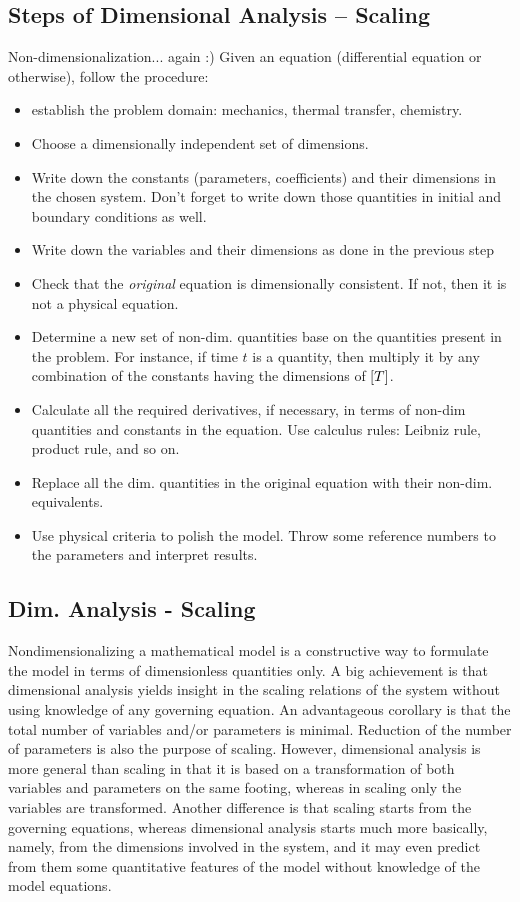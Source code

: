 \subsection{Steps of Dimensional Analysis -- Scaling}
Non-dimensionalization... again :) Given an equation (differential equation or otherwise), follow the procedure:
\begin{itemize}
\item establish the problem domain: mechanics, thermal transfer, chemistry.
%
\item Choose a dimensionally independent set of dimensions.
%
\item Write down the constants (parameters, coefficients) and their dimensions in the chosen system. Don't forget to write down those quantities in initial and boundary conditions as well.
%
\item Write down the variables and their dimensions as done in the previous step
%
\item Check that the \emph{original} equation is dimensionally consistent. If not, then it is not a physical equation.
%
\item Determine a new set of non-dim. quantities base on the quantities present in the problem. For instance, if time $t$ is a quantity, then multiply it by any combination of the constants having the dimensions of $\left[{T}\right]$.
%
\item Calculate all the required derivatives, if necessary, in terms of non-dim quantities and constants in the equation. Use calculus rules: Leibniz rule, product rule, and so on.
%
\item Replace all the dim. quantities in the original equation with their non-dim. equivalents.
%
\item Use physical criteria to polish the model. Throw some reference numbers to the parameters and interpret results.
%
\end{itemize}


\subsection{Dim. Analysis - Scaling}
Nondimensionalizing a mathematical model is a constructive way to formulate the model in terms of dimensionless quantities only. A big achievement is that dimensional analysis yields insight in the scaling relations of the system without using knowledge of any governing equation. An advantageous corollary is that the total number of variables and/or parameters is minimal. Reduction of the number of parameters is also the purpose of scaling. However, dimensional analysis is more general than scaling in that it is based on a transformation of both variables and parameters on the same footing, whereas in scaling only the variables are transformed. Another difference is that scaling starts from the governing equations, whereas dimensional analysis starts much more basically, namely, from the dimensions involved in the system, and it may even predict from them some quantitative features of the model without knowledge of the model equations.


